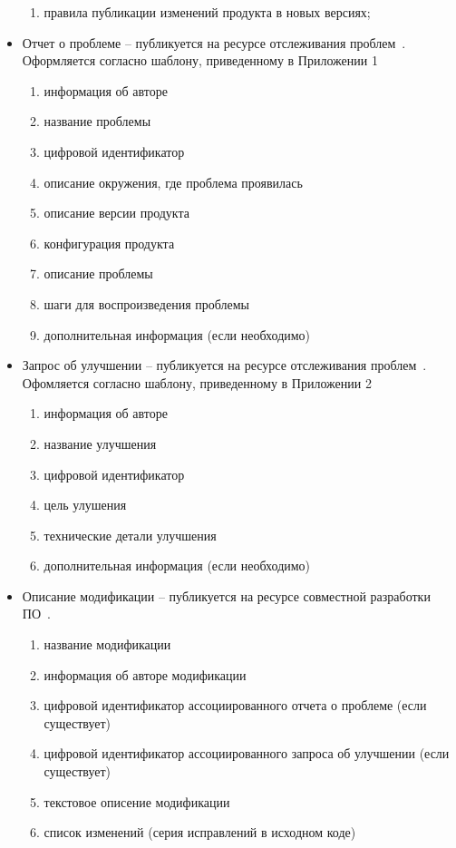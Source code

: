 \begin{itemize}
\begin{enumerate}
        \item правила публикации изменений продукта в новых версиях;
    \end{enumerate}

    \item Отчет о проблеме -- публикуется на ресурсе отслеживания проблем~\cite{qemubugtracker}.
    Оформляется согласно шаблону, приведенному в Приложении 1
    \begin{enumerate}
        \item информация об авторе
        \item название проблемы
        \item цифровой идентификатор
        \item описание окружения, где проблема проявилась
        \item описание версии продукта
        \item конфигурация продукта
        \item описание проблемы
        \item шаги для воспроизведения проблемы
        \item дополнительная информация (если необходимо)
    \end{enumerate}

    \item Запрос об улучшении -- публикуется на ресурсе отслеживания проблем~\cite{qemubugtracker}.
    Офомляется согласно шаблону, приведенному в Приложении 2
    \begin{enumerate}
        \item информация об авторе
        \item название улучшения
        \item цифровой идентификатор
        \item цель улушения
        \item технические детали улучшения
        \item дополнительная информация (если необходимо)
    \end{enumerate}

    \item Описание модификации -- публикуется на ресурсе совместной разработки ПО~\cite{qemusrchosting,qemupatchew}.
    \begin{enumerate}
        \item название модификации
        \item информация об авторе модификации
        \item цифровой идентификатор ассоциированного отчета о проблеме (если существует)
        \item цифровой идентификатор ассоциированного запроса об улучшении (если существует)
        \item текстовое описение модификации
        \item список изменений (серия исправлений в исходном коде)
    \end{enumerate}



\end{itemize}
